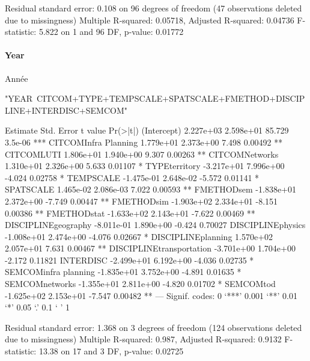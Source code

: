 Residual standard error: 0.108 on 96 degrees of freedom
  (47 observations deleted due to missingness)
Multiple R-squared:  0.05718,	Adjusted R-squared:  0.04736 
F-statistic: 5.822 on 1 and 96 DF,  p-value: 0.01772


\paragraph{Year}{Année}

"YEAR~CITCOM+TYPE+TEMPSCALE+SPATSCALE+FMETHOD+DISCIPLINE+INTERDISC+SEMCOM"

                           Estimate Std. Error t value Pr(>|t|)    
(Intercept)               2.227e+03  2.598e+01  85.729  3.5e-06 ***
CITCOMInfra Planning      1.779e+01  2.373e+00   7.498  0.00492 ** 
CITCOMLUTI                1.806e+01  1.940e+00   9.307  0.00263 ** 
CITCOMNetworks            1.310e+01  2.326e+00   5.633  0.01107 *  
TYPEterritory            -3.217e+01  7.996e+00  -4.024  0.02758 *  
TEMPSCALE                -1.475e-01  2.648e-02  -5.572  0.01141 *  
SPATSCALE                 1.465e-02  2.086e-03   7.022  0.00593 ** 
FMETHODsem               -1.838e+01  2.372e+00  -7.749  0.00447 ** 
FMETHODsim               -1.903e+02  2.334e+01  -8.151  0.00386 ** 
FMETHODstat              -1.633e+02  2.143e+01  -7.622  0.00469 ** 
DISCIPLINEgeography      -8.011e-01  1.890e+00  -0.424  0.70027    
DISCIPLINEphysics        -1.008e+01  2.474e+00  -4.076  0.02667 *  
DISCIPLINEplanning        1.570e+02  2.057e+01   7.631  0.00467 ** 
DISCIPLINEtransportation -3.701e+00  1.704e+00  -2.172  0.11821    
INTERDISC                -2.499e+01  6.192e+00  -4.036  0.02735 *  
SEMCOMinfra planning     -1.835e+01  3.752e+00  -4.891  0.01635 *  
SEMCOMnetworks           -1.355e+01  2.811e+00  -4.820  0.01702 *  
SEMCOMtod                -1.625e+02  2.153e+01  -7.547  0.00482 ** 
---
Signif. codes:  0 ‘***’ 0.001 ‘**’ 0.01 ‘*’ 0.05 ‘.’ 0.1 ‘ ’ 1

Residual standard error: 1.368 on 3 degrees of freedom
  (124 observations deleted due to missingness)
Multiple R-squared:  0.987,	Adjusted R-squared:  0.9132 
F-statistic: 13.38 on 17 and 3 DF,  p-value: 0.02725









